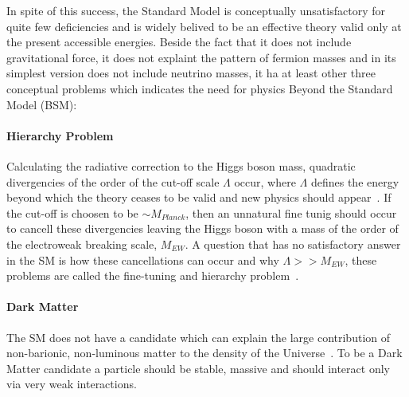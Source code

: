 In spite of this success, the Standard Model is conceptually unsatisfactory for quite few deficiencies and is
widely belived to be an effective theory valid only at the present accessible energies. Beside the fact that 
it does not  include  gravitational force, it does not explaint the pattern of fermion masses and in its simplest 
version does not include neutrino masses, it ha at least other three conceptual problems which indicates the need 
for physics Beyond the Standard Model (BSM):
\paragraph{Hierarchy Problem} Calculating the radiative correction to the Higgs boson mass, quadratic divergencies of the order  
	of the cut-off scale $\Lambda$ occur, where  $\Lambda$ defines  the energy
	beyond which the theory ceases to be valid and new physics should appear~\cite{Djuadi4}. If the cut-off is choosen 
	to be $\sim M_{Planck}$, then an 
	unnatural fine tunig should occur to cancell these divergencies leaving the Higgs boson with a mass of the order of the electroweak breaking scale, $M_{EW}$.
	A question that has no satisfactory answer in the SM is how these cancellations can occur and why $\Lambda >> M_{EW}$, these problems are
	called the fine-tuning and hierarchy problem~\cite{Hierarchy1,Hierarchy2,Hierarchy3}.

\paragraph{Dark Matter}   The SM does not have a candidate which can explain the large contribution 
	of non-barionic, non-luminous matter to the density of the Universe~\cite{darkmatter1,darkmatter2,darkmatter3}. To be a Dark Matter candidate a particle should be
	stable, massive and should interact only via very weak interactions. 

